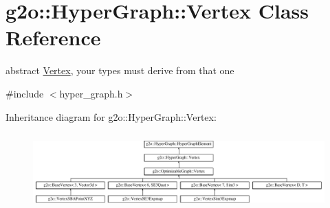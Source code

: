 \hypertarget{classg2o_1_1_hyper_graph_1_1_vertex}{}\section{g2o\+:\+:Hyper\+Graph\+:\+:Vertex Class Reference}
\label{classg2o_1_1_hyper_graph_1_1_vertex}


abstract \mbox{\hyperlink{classg2o_1_1_hyper_graph_1_1_vertex}{Vertex}}, your types must derive from that one  




{\ttfamily \#include $<$hyper\+\_\+graph.\+h$>$}

Inheritance diagram for g2o\+:\+:Hyper\+Graph\+:\+:Vertex\+:\begin{figure}[H]
\begin{center}
\leavevmode
\includegraphics[height=2.953586cm]{classg2o_1_1_hyper_graph_1_1_vertex}
\end{center}
\end{figure}
